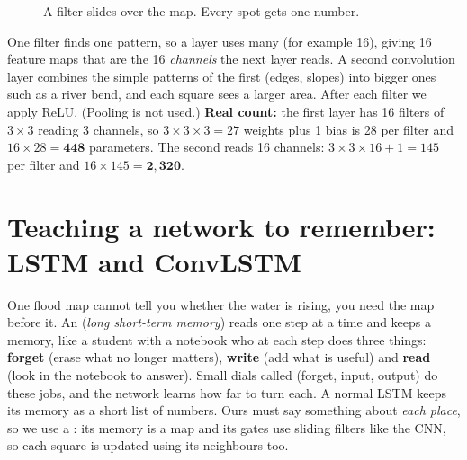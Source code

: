 \begin{figure}[!htbp]
\centering
{}
\caption{A filter slides over the map. Every spot gets one number.}
\end{figure}

One filter finds one pattern, so a layer uses many (for example 16), giving 16 feature maps that are the 16 \emph{channels} the next layer reads. A second convolution layer combines the simple patterns of the first (edges, slopes) into bigger ones such as a river bend, and each square sees a larger area. After each filter we apply ReLU. (Pooling is not used.) \textbf{Real count:} the first layer has 16 filters of $3\times3$ reading 3 channels, so $3\times3\times3=27$ weights plus 1 bias is 28 per filter and $16\times28=\mathbf{448}$ parameters. The second reads 16 channels: $3\times3\times16+1=145$ per filter and $16\times145=\mathbf{2{,}320}$.

\section{Teaching a network to remember: LSTM and ConvLSTM}\label{ch:lstm}

One flood map cannot tell you whether the water is rising, you need the map before it. An  (\emph{long short-term memory}) reads one step at a time and keeps a memory, like a student with a notebook who at each step does three things: \textbf{forget} (erase what no longer matters), \textbf{write} (add what is useful) and \textbf{read} (look in the notebook to answer). Small dials called  (forget, input, output) do these jobs, and the network learns how far to turn each. A normal LSTM keeps its memory as a short list of numbers. Ours must say something about \emph{each place}, so we use a : its memory is a map and its gates use sliding filters like the CNN, so each square is updated using its neighbours too.

